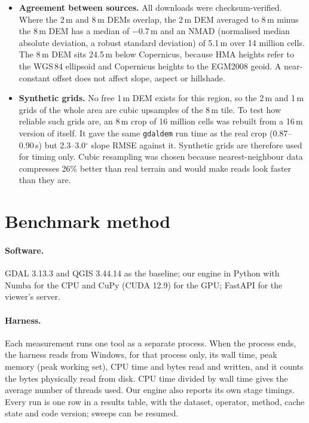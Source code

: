 \documentclass[11pt,a4paper]{article}
\begin{document}
\begin{itemize}
  \item \textbf{Agreement between sources.} All downloads were checksum-verified. Where the 2\,m and 8\,m DEMs
  overlap, the 2\,m DEM averaged to 8\,m minus the 8\,m DEM has a median of $-0.7$\,m and an NMAD (normalised median
  absolute deviation, a robust standard deviation) of 5.1\,m over 14 million cells. The 8\,m DEM sits 24.5\,m below
  Copernicus, because HMA heights refer to the WGS\,84 ellipsoid and Copernicus heights to the EGM2008 geoid. A
  near-constant offset does not affect slope, aspect or hillshade.
  \item \textbf{Synthetic grids.} No free 1\,m DEM exists for this region, so the 2\,m and 1\,m grids of the whole
  area are cubic upsamples of the 8\,m tile. To test how reliable such grids are, an 8\,m crop of 16 million cells
  was rebuilt from a 16\,m version of itself. It gave the same \texttt{gdaldem} run time as the real crop
  (0.87--0.90\,s) but 2.3--3.0$^\circ$ slope RMSE against it. Synthetic grids are therefore used for timing only.
  Cubic resampling was chosen because nearest-neighbour data compresses 26\% better than real terrain and would make
  reads look faster than they are.
\end{itemize}

\section{Benchmark method}\label{sec:method}
\paragraph{Software.} GDAL 3.13.3 and QGIS 3.44.14 as the baseline; our engine in Python with Numba \cite{numba}
for the CPU and CuPy \cite{cupy} (CUDA 12.9) for the GPU; FastAPI for the viewer's server.

\paragraph{Harness.} Each measurement runs one tool as a separate process. When the process ends, the harness reads
from Windows, for that process only, its wall time, peak memory (peak working set), CPU time and bytes read and
written, and it counts the bytes physically read from disk. CPU time divided by wall time gives the average number
of threads used. Our engine also reports its own stage timings. Every run is one row in a results table, with the
dataset, operator, method, cache state and code version; sweeps can be resumed.
\end{document}
